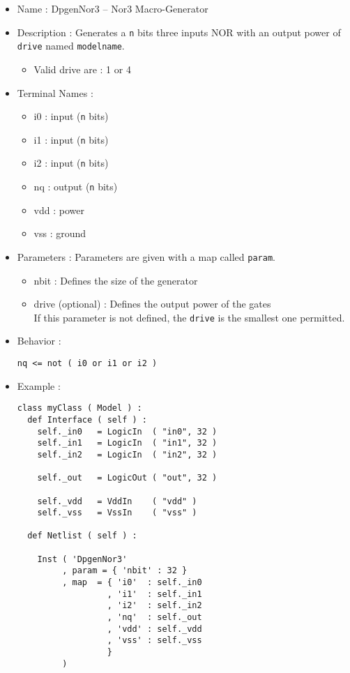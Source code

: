 \begin{itemize}
    \item Name : DpgenNor3 -- Nor3 Macro-Generator
    \item Description : Generates a \verb-n- bits three inputs NOR with an output power of \verb-drive- named \verb-modelname-.
    \begin{itemize}
        \item Valid drive are : 1 or 4
    \end{itemize}
    \item Terminal Names :
    \begin{itemize}
        \item i0 : input (\verb-n- bits)
        \item i1 : input (\verb-n- bits)
        \item i2 : input (\verb-n- bits)
        \item nq : output (\verb-n- bits)
        \item vdd : power
        \item vss : ground
    \end{itemize}
    \item Parameters : Parameters are given with a map called \verb-param-.
    \begin{itemize}
        \item nbit : Defines the size of the generator
        \item drive (optional) : Defines the output power of the gates\\If this parameter is not defined, the \verb-drive- is the smallest one permitted.
    \end{itemize}
    \item Behavior :
\begin{verbatim}
nq <= not ( i0 or i1 or i2 )
\end{verbatim}
    \item Example :
\begin{verbatim}
class myClass ( Model ) :
  def Interface ( self ) :
    self._in0   = LogicIn  ( "in0", 32 )
    self._in1   = LogicIn  ( "in1", 32 )
    self._in2   = LogicIn  ( "in2", 32 )
    
    self._out   = LogicOut ( "out", 32 )

    self._vdd   = VddIn    ( "vdd" )
    self._vss   = VssIn    ( "vss" )
    
  def Netlist ( self ) :
      
    Inst ( 'DpgenNor3'
         , param = { 'nbit' : 32 }
         , map  = { 'i0'  : self._in0
                  , 'i1'  : self._in1
                  , 'i2'  : self._in2
                  , 'nq'  : self._out
                  , 'vdd' : self._vdd
                  , 'vss' : self._vss
                  }
         )
\end{verbatim}
\end{itemize}
